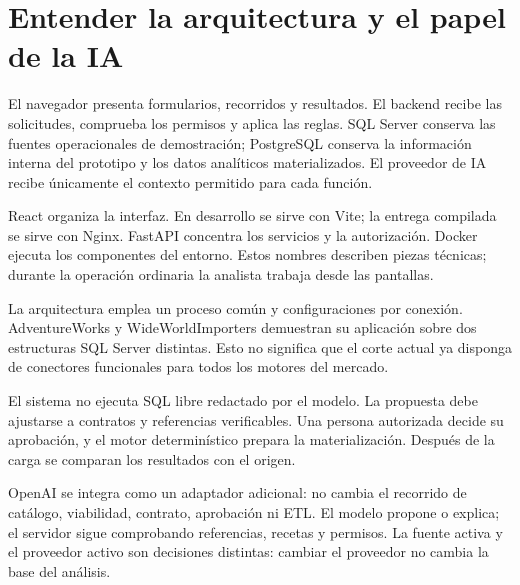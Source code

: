 \chapter{Entender la arquitectura y el papel de la IA}
El navegador presenta formularios, recorridos y resultados. El backend recibe las solicitudes, comprueba los permisos y aplica las reglas. SQL Server conserva las fuentes operacionales de demostración; PostgreSQL conserva la información interna del prototipo y los datos analíticos materializados. El proveedor de IA recibe únicamente el contexto permitido para cada función.

React organiza la interfaz. En desarrollo se sirve con Vite; la entrega compilada se sirve con Nginx. FastAPI concentra los servicios y la autorización. Docker ejecuta los componentes del entorno. Estos nombres describen piezas técnicas; durante la operación ordinaria la analista trabaja desde las pantallas.

La arquitectura emplea un proceso común y configuraciones por conexión. AdventureWorks y WideWorldImporters demuestran su aplicación sobre dos estructuras SQL Server distintas. Esto no significa que el corte actual ya disponga de conectores funcionales para todos los motores del mercado.

El sistema no ejecuta SQL libre redactado por el modelo. La propuesta debe ajustarse a contratos y referencias verificables. Una persona autorizada decide su aprobación, y el motor determinístico prepara la materialización. Después de la carga se comparan los resultados con el origen.

OpenAI se integra como un adaptador adicional: no cambia el recorrido de catálogo, viabilidad, contrato, aprobación ni ETL. El modelo propone o explica; el servidor sigue comprobando referencias, recetas y permisos. La fuente activa y el proveedor activo son decisiones distintas: cambiar el proveedor no cambia la base del análisis.

